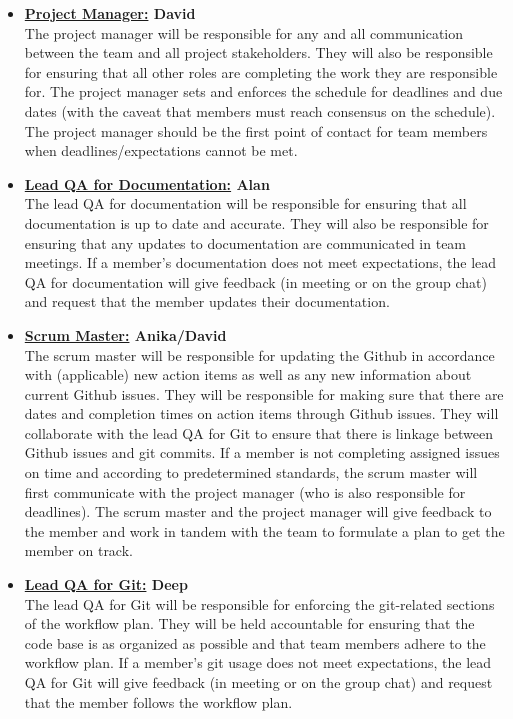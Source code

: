 \documentclass{article}
\begin{document}
\begin{itemize}
	\item \textbf{\underline{Project Manager:} David} \\
	      The project manager will be responsible for any and all communication between the team and all project stakeholders.
	      They will also be responsible for ensuring that all other roles are completing the work they are responsible for.
	      The project manager sets and enforces the schedule for deadlines and due dates (with the caveat that members must reach consensus on the schedule).
	      The project manager should be the first point of contact for team members when deadlines/expectations cannot be met.

	\item \textbf{\underline{Lead QA for Documentation:} Alan} \\
	      The lead QA for documentation will be responsible for ensuring that all documentation is up to date and accurate.
	      They will also be responsible for ensuring that any updates to documentation are communicated in team meetings.
	      If a member's documentation does not meet expectations, the lead QA for documentation will give feedback (in meeting or on the group chat)
	      and request that the member updates their documentation.

	\item \textbf{\underline{Scrum Master:} Anika/David} \\
	      The scrum master will be responsible for updating the Github in accordance with (applicable) new action items
	      as well as any new information about current Github issues.
	      They will be responsible for making sure that there are dates and completion times on action items through Github issues.
	      They will collaborate with the lead QA for Git to ensure that there is linkage between Github issues and git commits.
	      If a member is not completing assigned issues on time and according to predetermined standards, the scrum master will first
	      communicate with the project manager (who is also responsible for deadlines).
	      The scrum master and the project manager will give feedback to the member and work in tandem
	      with the team to formulate a plan to get the member on track.

	\item \textbf{\underline{Lead QA for Git:} Deep} \\
	      The lead QA for Git will be responsible for enforcing the git-related sections of the workflow plan.
	      They will be held accountable for ensuring that the code base is as organized as possible and
	      that team members adhere to the workflow plan.
	      If a member's git usage does not meet expectations, the lead QA for Git will give
	      feedback (in meeting or on the group chat) and request that the member follows the workflow plan.


\end{itemize}
\end{document}
